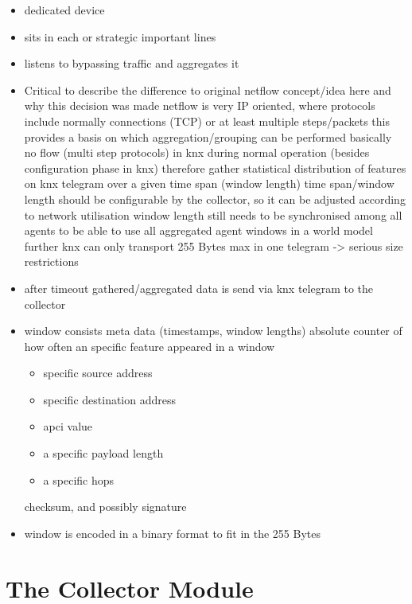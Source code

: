\begin{itemize}
	\item dedicated device
	\item sits in each or strategic important lines
	\item listens to bypassing traffic and aggregates it
	\item \alert{Critical to describe the difference to original netflow concept/idea here and why this decision was made}
		\subitem netflow is very IP oriented, where protocols include normally connections (TCP) or at least multiple steps/packets
		\subitem this provides a basis on which aggregation/grouping can be performed
		\subitem basically no flow (multi step protocols) in \gls{knx} during normal operation (besides configuration phase in \gls{knx})
		\subitem therefore gather statistical distribution of features on \gls{knx} \gls{telegram} over a given time span (window length)
		\subitem time span/window length should be configurable by the collector, so it can be adjusted according to network utilisation
		\subitem window length still needs to be synchronised among all agents to be able to use all aggregated agent windows in a world model
		\subitem further \gls{knx} can only transport 255 Bytes max in one telegram -> serious size restrictions
	\item after timeout gathered/aggregated data is send via \gls{knx} \gls{telegram} to the collector
	\item window consists
		\subitem meta data (timestamps, window lengths)
		\subitem absolute counter of how often an specific feature appeared in a window
			\begin{itemize}
				\item specific source address
				\item specific destination address
				\item apci value
				\item a specific payload length
				\item a specific \gls{hops}
			\end{itemize}
		\subitem checksum, and possibly signature
	\item window is encoded in a binary format to fit in the 255 Bytes
\end{itemize}

\section{The Collector Module}
\label{sec:concept:collector}

